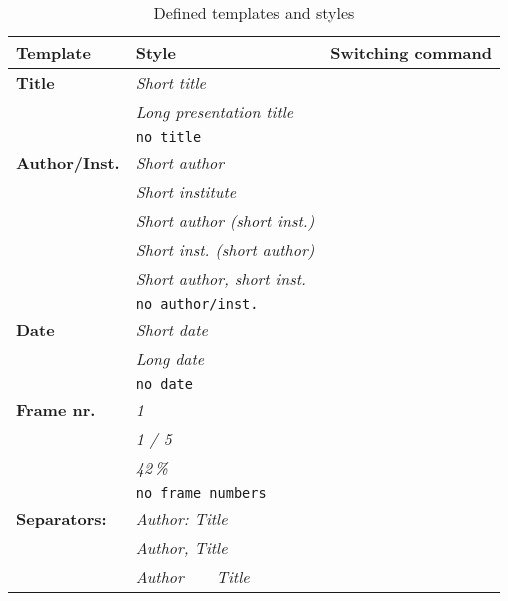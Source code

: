 \documentclass[11pt]{ltxdoc}
\newcommand{\ltxcmd}[1]{\texttt{#1}}
\begin{document}
	\begin{table} \centering\renewcommand{\arraystretch}{1.25}
		\begin{tabular}{lll}
			Template              & Style                               & Switching command             \\ \hline\hline
			\textbf{Title}        & \textit{Short title}                & \ltxcmd{\htfshorttitle}       \\
			                      & \textit{Long presentation title}    & \ltxcmd{\htflongtitle}        \\
			                      & \texttt{no title}                   & \ltxcmd{\htfnotitle}          \\ \hline
			\textbf{Author/Inst.} & \textit{Short author}               & \ltxcmd{\htfonlyauthor}       \\
			                      & \textit{Short institute}            & \ltxcmd{\htfonlyinstitute}    \\
			                      & \textit{Short author (short inst.)} & \ltxcmd{\htfinstitutepths}    \\
			                      & \textit{Short inst. (short author)} & \ltxcmd{\htfauthorpths}       \\
			                      & \textit{Short author, short inst.}  & \ltxcmd{\htfauthinst}         \\
			                      & \texttt{no author/inst.}            & \ltxcmd{\htfnoauthinst}       \\ \hline
			\textbf{Date}         & \textit{Short date}                 & \ltxcmd{\htfshortdate}        \\
			                      & \textit{Long date}                  & \ltxcmd{\htflongdate}         \\
			                      & \texttt{no date}                    & \ltxcmd{\htfnodate}           \\ \hline
			\textbf{Frame nr.}    & \textit{1}                          & \ltxcmd{\htfcounterframenrs}  \\
			                      & \textit{1 / 5}                      & \ltxcmd{\htffractionframenrs} \\
			                      & \textit{42\,\%}                     & \ltxcmd{\htfpercentframenrs}  \\
			                      & \texttt{no frame numbers}           & \ltxcmd{\htfnoframenrs}       \\ \hline
			\textbf{Separators:}  & \textit{Author: Title}              & \ltxcmd{\htfcolonsep}         \\
			                      & \textit{Author, Title}              & \ltxcmd{\htfcommasep}         \\
			                      & \textit{Author~~~~Title}            & \ltxcmd{\htfsepspace}
		\end{tabular}
		
		\caption{Defined templates and styles}
		\label{deftemplates}
	\end{table}
	
\end{document}
